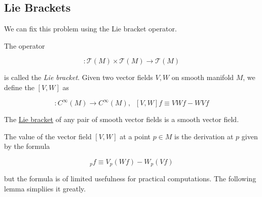 \documentclass{article}
\newcounter{definition}[section]
\begin{document}
  \subsection{Lie Brackets}

    We can fix this problem using the Lie bracket operator. 

    \begin{definition}
      \label{def:lie-bracket}
    The operator 

      \begin{equation}
        [\cdot, \cdot]: \mathcal{T}(M) \times \mathcal{T} (M) \to \mathcal{T}(M)
      \end{equation}

    is called the \textit{Lie bracket}. Given two vector fields $V, W$ on smooth manifold $M$, we define the $[V, W]$ as 

      \begin{equation}
        [V, W]: C^\infty(M) \to C^\infty (M), \;\; [V, W] f \equiv V W f - W V f
      \end{equation}
    \end{definition}

    \begin{lemma}
      \label{thm:the-lie-bracket-of-smooth-fields-is-smooth}
      The \hyperref[def:lie-bracket]{Lie bracket} of any pair of smooth vector fields is a smooth vector field.
    \end{lemma}

    The value of the vector field $[V, W]$ at a point $p \in M$ is the derivation at $p$ given by the formula

      \begin{equation}
        [V, W]_p f \equiv V_p (W f) - W_p (V f)
      \end{equation}

    but the formula is of limited usefulness for practical computations. The following lemma simpliies it greatly. 
\end{document}
